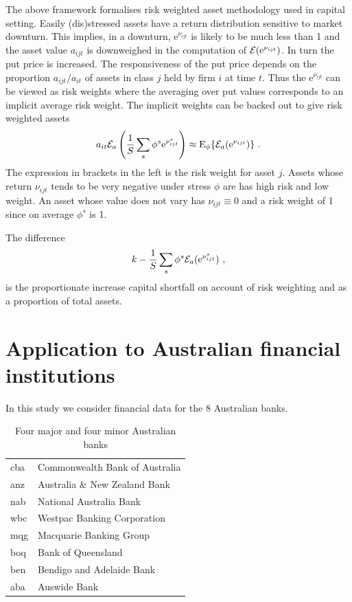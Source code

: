 \documentclass[authoryear]{elsarticle}
\newcommand{\e}{\mathrm{e}}
\newcommand{\Ex}{{\cal E}}
\newcommand{\be}[1]{\begin{equation}\label{#1}}
\newcommand{\ee}{\end{equation}}
\begin{document}
The above framework formalises risk weighted asset methodology  used in capital setting.   Easily (dis)stressed assets have a return distribution sensitive to market downturn.   This implies, in a downturn, $\e^{\nu_{ijt}}$ is likely to be much less than 1 and the asset value $a_{ijt}$ is downweighed in the computation of $\Ex(\e^{\nu_{ijt}})$.  In turn the put price is increased.  The responsiveness of the put price depends on the proportion $a_{ijt}/a_{it}$ of assets in class $j$ held by firm $i$ at time $t$.   Thus the $\e^{\nu_{ijt}}$ can be viewed  as risk weights where the averaging over put values corresponds  to an implicit average risk weight.   The implicit weights can be backed out to give risk weighted assets
\be{rwa}
a_{it}\Ex_a\left( \frac{1}{S}\sum_s\phi^s\e^{\nu_{ijt}^s}\right)\approx \Es\{\Ex_a(\e^{\nu_{ijt}})\} \ .
\ee
The expression in  brackets in the left is the risk weight for asset $j$.   Assets whose return $\nu_{ijt}$  tends to be very negative under stress $\phi$ are has high risk and low weight.  An asset whose value does not vary has $\nu_{ijt}\equiv 0$ and  a risk weight of 1 since on average $\phi^s$ is 1.

The difference
$$
k - \frac{1}{S}\sum_s\phi^s\Ex_a(\e^{\nu_{ijt}^s})\ ,
$$
is the proportionate increase capital shortfall on account of risk weighting and as a proportion of total assets.



\section{Application to Australian financial institutions}

In this study we consider financial data for  the 8 Australian banks.

\begin{table}[htdp]
\caption{Four major and four minor Australian banks}
\begin{center}
\begin{tabular}{l|l}
\hline
cba & Commonwealth Bank of Australia\\
anz & Australia \& New Zealand Bank\\
nab & National Australia Bank\\
wbc & Westpac Banking Corporation\\
\hline
mqg & Macquarie Banking Group\\
boq & Bank of Queensland\\
ben & Bendigo and Adelaide Bank\\
aba & Auswide Bank\\
\hline
\end{tabular}
\end{center}
\label{banks}
\end{table}%
\end{document}
